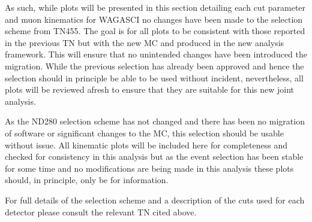 \documentclass[%
 reprint,
 amsmath,amssymb,
 aps,
]{revtex4-2}
\begin{document}
As such, while plots will be presented in this section detailing each cut parameter and muon kinematics for WAGASCI no changes have been made to the selection scheme from TN455. The goal is for all plots to be consistent with those reported in the previous TN but with the new MC and produced in the new analysis framework. This will ensure that no unintended changes have been introduced the migration. While the previous selection has already been approved and hence the selection should in principle be able to be used without incident, nevertheless, all plots will be reviewed afresh to ensure that they are suitable for this new joint analysis. 

As the ND280 selection scheme has not changed and there has been no migration of software or significant changes to the MC, this selection should be usable without issue. All kinematic plots will be included here for completeness and checked for consistency in this analysis but as the event selection has been stable for some time and no modifications are being made in this analysis these plots should, in principle, only be for information. 

For full details of the selection scheme and a description of the cuts used for each detector please consult the relevant TN cited above.
\end{document}
